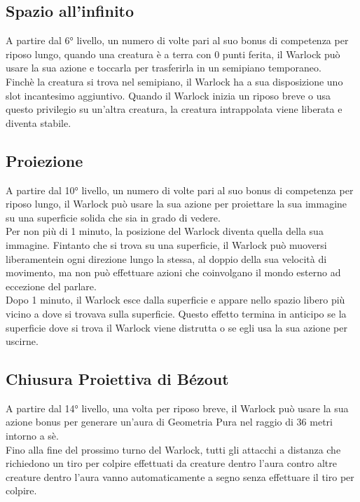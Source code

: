 \documentclass[letterpaper,twocolumn,openany,nodeprecatedcode]{dndbook}
\begin{document}
\subsection{Spazio all'infinito}
A partire dal 6° livello, un numero di volte pari al suo bonus di competenza per riposo lungo, quando una creatura è a terra con 0 punti ferita, il Warlock può usare la sua azione e toccarla per trasferirla in un semipiano temporaneo. \\ 
Finchè la creatura si trova nel semipiano, il Warlock ha a sua disposizione uno slot incantesimo aggiuntivo. Quando il Warlock inizia un riposo breve o usa questo privilegio su un'altra creatura, la creatura intrappolata viene liberata e diventa stabile.

\subsection{Proiezione}
A partire dal 10° livello, un numero di volte pari al suo bonus di competenza per riposo lungo, il Warlock può usare la sua azione per proiettare la sua immagine su una superficie solida che sia in grado di vedere. \\ 
Per non più di 1 minuto, la posizione del Warlock diventa quella della sua immagine. Fintanto che si trova su una superficie, il Warlock può muoversi liberamentein ogni direzione lungo la stessa, al doppio della sua velocità di movimento, ma non può effettuare azioni che coinvolgano il mondo esterno ad eccezione del parlare. \\ 
Dopo 1 minuto, il Warlock esce dalla superficie e appare nello spazio libero più vicino a dove si trovava sulla superficie. Questo effetto termina in anticipo se la superficie dove si trova il Warlock viene distrutta o se egli usa la sua azione per uscirne.

\subsection{Chiusura Proiettiva di Bézout}
A partire dal 14° livello, una volta per riposo breve, il Warlock può usare la sua azione bonus per generare un'aura di Geometria Pura nel raggio di 36 metri intorno a sè. \\ 
Fino alla fine del prossimo turno del Warlock, tutti gli attacchi a distanza che richiedono un tiro per colpire effettuati da creature dentro l'aura contro altre creature dentro l'aura vanno automaticamente a segno senza effettuare il tiro per colpire.
\end{document}

